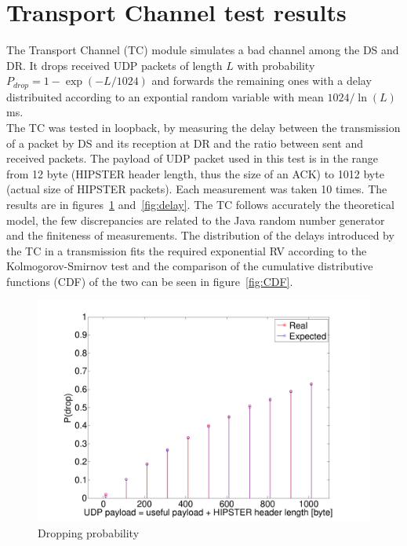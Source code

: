 \documentclass[10pt,twocolumn]{article}
\begin{document}
\section{Transport Channel test results}
The Transport Channel (TC) module simulates a bad channel among the DS and DR. It drops received UDP packets of length $L$ with probability $P_{drop} = 1 - \exp(-L/1024)$ and forwards the remaining ones with a delay distribuited according to an expontial random variable with mean $1024/\ln(L)$ ms. \\
The TC was tested in loopback, by measuring the delay between the transmission of a packet by DS and its reception at DR and the ratio between sent and received packets. The payload of UDP packet used in this test is in the range from 12 byte (HIPSTER header length, thus the size of an ACK) to 1012 byte (actual size of HIPSTER packets). Each measurement was taken 10 times. The results are in figures~\ref{fig:pDrop} and~\ref{fig:delay}. The TC follows accurately the theoretical model, the few discrepancies are related to the Java random number generator and the finiteness of measurements. The distribution of the delays introduced by the TC in a transmission fits the required exponential RV according to the Kolmogorov-Smirnov test and the comparison of the cumulative distributive functions (CDF) of the two can be seen in figure~\ref{fig:CDF}.

\begin{figure}[h!]
  \centering
  \includegraphics[width=0.95\columnwidth, keepaspectratio]{tex/images/pdrop.pdf}
  \caption{Dropping probability}
  \label{fig:pDrop}
\end{figure}
\end{document}
